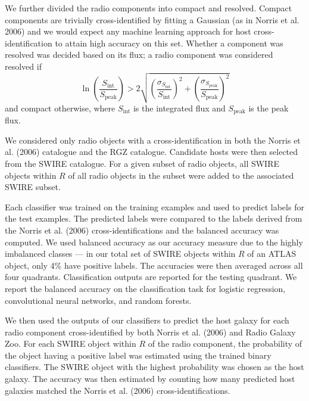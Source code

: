\documentclass[fleqn,usenatbib,usedcolumn]{mnras}
\newcommand{\text}{\mathrm}
\begin{document}
    We further divided the radio components into compact and resolved.
    Compact components are trivially cross-identified by fitting a Gaussian
    (as in Norris et al. 2006) and we would expect any machine learning
    approach for host cross-identification to attain high accuracy on this
    set. Whether a component was resolved was decided based on its flux; a
    radio component was considered resolved if \[
        \ln \left(\frac{S_{\text{int}}}{S_{\text{peak}}}\right) > 2\sqrt{\left(\frac{\sigma_{S_{\text{int}}}}{S_{\text{int}}}\right)^2 + \left(\frac{\sigma_{S_{\text{peak}}}}{S_{\text{peak}}}\right)^2}
    \] and compact otherwise, where \(S_{\text{int}}\) is the integrated
    flux and \(S_{\text{peak}}\) is the peak flux.

    We considered only radio objects with a cross-identification in both the
    Norris et al. (2006) catalogue and the RGZ catalogue. Candidate hosts
    were then selected from the SWIRE catalogue. For a given subset of radio
    objects, all SWIRE objects within \(R\) of all radio objects in the
    subset were added to the associated SWIRE subset.

    Each classifier was trained on the training examples and used to predict
    labels for the test examples. The predicted labels were compared to the
    labels derived from the Norris et al. (2006) cross-identifications and
    the balanced accuracy was computed. We used balanced accuracy as our
    accuracy measure due to the highly imbalanced classes --- in our total
    set of SWIRE objects within \(R\) of an ATLAS object, only 4\% have
    positive labels. The accuracies were then averaged across all four
    quadrants. Classification outputs are reported for the testing quadrant.
    We report the balanced accuracy on the classification task for logistic
    regression, convolutional neural networks, and random forests.

    We then used the outputs of our classifiers to predict the host galaxy
    for each radio component cross-identified by both Norris et al. (2006)
    and Radio Galaxy Zoo. For each SWIRE object within \(R\) of the radio
    component, the probability of the object having a positive label was
    estimated using the trained binary classifiers. The SWIRE object with
    the highest probability was chosen as the host galaxy. The accuracy was
    then estimated by counting how many predicted host galaxies matched the
    Norris et al. (2006) cross-identifications.
\end{document}
